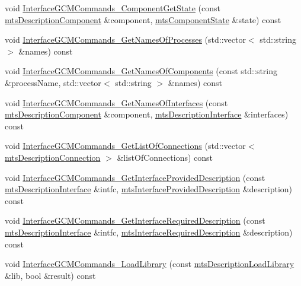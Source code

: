 \begin{DoxyCompactItemize}
\item 
void \hyperlink{classmts_manager_component_server_ae42ed223d038117a5588bcc640d162ab}{Interface\+G\+C\+M\+Commands\+\_\+\+Component\+Get\+State} (const \hyperlink{classmts_description_component}{mts\+Description\+Component} \&component, \hyperlink{classmts_component_state}{mts\+Component\+State} \&state) const 
\item 
void \hyperlink{classmts_manager_component_server_a82166415703899c3a250869bf8adbd59}{Interface\+G\+C\+M\+Commands\+\_\+\+Get\+Names\+Of\+Processes} (std\+::vector$<$ std\+::string $>$ \&names) const 
\item 
void \hyperlink{classmts_manager_component_server_abd512edd1f98f42ada757d78a113e57a}{Interface\+G\+C\+M\+Commands\+\_\+\+Get\+Names\+Of\+Components} (const std\+::string \&process\+Name, std\+::vector$<$ std\+::string $>$ \&names) const 
\item 
void \hyperlink{classmts_manager_component_server_ac67fcc9dd6ecc7205a783e2b5d31709c}{Interface\+G\+C\+M\+Commands\+\_\+\+Get\+Names\+Of\+Interfaces} (const \hyperlink{classmts_description_component}{mts\+Description\+Component} \&component, \hyperlink{classmts_description_interface}{mts\+Description\+Interface} \&interfaces) const 
\item 
void \hyperlink{classmts_manager_component_server_a343cbce6cf3d4e2af99e95af0ef0a9d7}{Interface\+G\+C\+M\+Commands\+\_\+\+Get\+List\+Of\+Connections} (std\+::vector$<$ \hyperlink{classmts_description_connection}{mts\+Description\+Connection} $>$ \&list\+Of\+Connections) const 
\item 
void \hyperlink{classmts_manager_component_server_a28987b940123ebebf65ede751021a6ec}{Interface\+G\+C\+M\+Commands\+\_\+\+Get\+Interface\+Provided\+Description} (const \hyperlink{classmts_description_interface}{mts\+Description\+Interface} \&intfc, \hyperlink{classmts_interface_provided_description}{mts\+Interface\+Provided\+Description} \&description) const 
\item 
void \hyperlink{classmts_manager_component_server_a44e58ed09a6b9c7b2caa977923ca9b1a}{Interface\+G\+C\+M\+Commands\+\_\+\+Get\+Interface\+Required\+Description} (const \hyperlink{classmts_description_interface}{mts\+Description\+Interface} \&intfc, \hyperlink{classmts_interface_required_description}{mts\+Interface\+Required\+Description} \&description) const 
\item 
void \hyperlink{classmts_manager_component_server_a973ef27b54522196c93567c11a4f4bf9}{Interface\+G\+C\+M\+Commands\+\_\+\+Load\+Library} (const \hyperlink{classmts_description_load_library}{mts\+Description\+Load\+Library} \&lib, bool \&result) const 

\end{DoxyCompactItemize}
